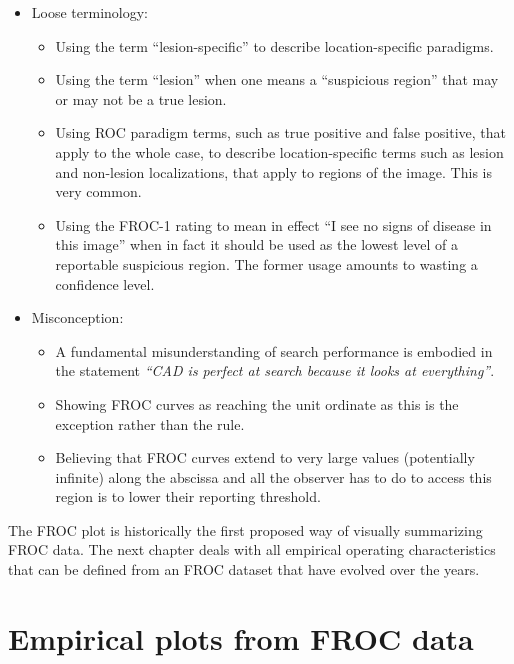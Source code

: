 \documentclass[
]{book}
\providecommand{\tightlist}{%
  \setlength{\itemsep}{0pt}\setlength{\parskip}{0pt}}
\begin{document}
\begin{itemize}
\tightlist
\item
  Loose terminology:

  \begin{itemize}
  \tightlist
  \item
    Using the term ``lesion-specific'' to describe location-specific paradigms.
  \item
    Using the term ``lesion'' when one means a ``suspicious region'' that may or may not be a true lesion.
  \item
    Using ROC paradigm terms, such as true positive and false positive, that apply to the whole case, to describe location-specific terms such as lesion and non-lesion localizations, that apply to regions of the image. This is very common.
  \item
    Using the FROC-1 rating to mean in effect ``I see no signs of disease in this image'' when in fact it should be used as the lowest level of a reportable suspicious region. The former usage amounts to wasting a confidence level.
  \end{itemize}
\item
  Misconception:

  \begin{itemize}
  \tightlist
  \item
    A fundamental misunderstanding of search performance is embodied in the statement \emph{``CAD is perfect at search because it looks at everything''}.
  \item
    Showing FROC curves as reaching the unit ordinate as this is the exception rather than the rule.
  \item
    Believing that FROC curves extend to very large values (potentially infinite) along the abscissa and all the observer has to do to access this region is to lower their reporting threshold.
  \end{itemize}
\end{itemize}

The FROC plot is historically the first proposed way of visually summarizing FROC data. The next chapter deals with all empirical operating characteristics that can be defined from an FROC dataset that have evolved over the years.

\hypertarget{empirical}{%
\chapter{Empirical plots from FROC data}\label{empirical}}
\end{document}
